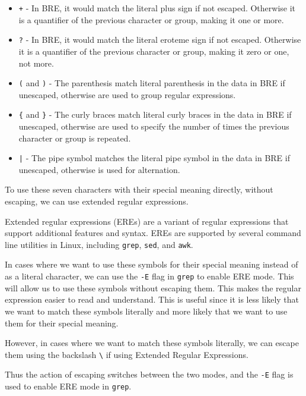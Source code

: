 \begin{itemize}
  \item \lstinline|+| - In BRE, it would match the literal plus sign if not escaped. Otherwise it is a quantifier of the previous character or group, making it one or more.
  \item \lstinline|?| - In BRE, it would match the literal eroteme sign if not escaped. Otherwise it is a quantifier of the previous character or group, making it zero or one, not more.
  \item \lstinline|(| and \lstinline|)| - The parenthesis match literal parenthesis in the data in BRE if unescaped, otherwise are used to group regular expressions.
  \item \lstinline|{| and \lstinline|}| - The curly braces match literal curly braces in the data in BRE if unescaped, otherwise are used to specify the number of times the previous character or group is repeated.
  \item \lstinline:|: - The pipe symbol matches the literal pipe symbol in the data in BRE if unescaped, otherwise is used for alternation.
\end{itemize}

To use these seven characters with their special meaning directly, without escaping, we can use extended regular expressions.

\begin{definition}
Extended regular expressions (EREs) are a variant of regular expressions that support additional features and syntax. EREs are supported by several command line utilities in Linux, including \lstinline|grep|, \lstinline|sed|, and \lstinline|awk|.
\end{definition}

In cases where we want to use these symbols for their special meaning
instead of as a literal character, we can use the \lstinline|-E| flag in \lstinline|grep| to enable ERE mode. This will allow us to use these symbols without escaping them. This makes the regular expression easier to read and understand.
This is useful since it is less likely that we want to match these symbols
literally and more likely that we want to use them for their special meaning.

However, in cases where we want to match these symbols literally, we can escape them using the backslash \lstinline|\| if using Extended Regular Expressions.

Thus the action of escaping switches between the two modes, and the \lstinline|-E| flag is used to enable ERE mode in \lstinline|grep|.

